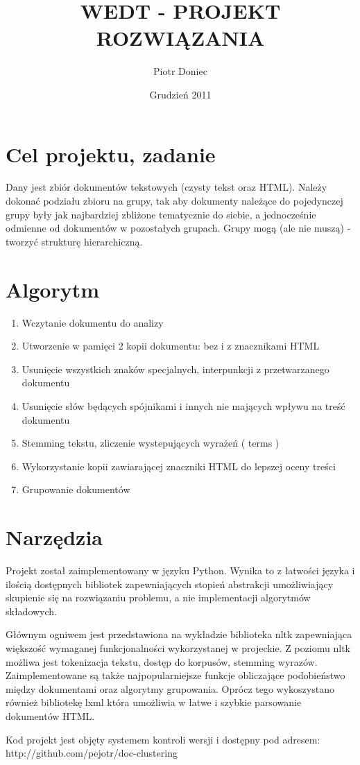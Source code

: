 \documentclass{article}
\begin{document}
\title{WEDT - PROJEKT ROZWIĄZANIA}
\author{Piotr Doniec}
\date {Grudzień 2011}
\maketitle

\section{Cel projektu, zadanie}
Dany jest zbiór dokumentów tekstowych (czysty tekst oraz HTML). Należy dokonać podziału zbioru na grupy, tak aby dokumenty należące do pojedynczej grupy były jak najbardziej zbliżone tematycznie do siebie, a jednocześnie odmienne od dokumentów w pozostałych grupach. Grupy mogą (ale nie muszą) - tworzyć strukturę hierarchiczną. 

\section{}



\section{Algorytm}
\begin{enumerate}
\item Wczytanie dokumentu do analizy
\item Utworzenie w pamięci 2 kopii dokumentu: bez i z znacznikami HTML
\item Usunięcie wszystkich znaków specjalnych, interpunkcji z przetwarzanego dokumentu
\item Usunięcie słów będących spójnikami i innych nie mających wpływu na treść dokumentu
\item Stemming tekstu, zliczenie wystepujących wyrażeń ( terms )
\item Wykorzystanie kopii zawiarającej znaczniki HTML do lepszej oceny treści
\item Grupowanie dokumentów
\end{enumerate}

\section{Narzędzia}
Projekt został zaimplementowany w języku Python. Wynika to z łatwości języka i ilością dostępnych bibliotek zapewniających stopień abstrakcji umożliwiający skupienie się na rozwiązaniu problemu, a nie implementacji algorytmów składowych.

Głównym ogniwem jest przedstawiona na wykładzie biblioteka nltk zapewniająca większość wymaganej funkcjonalności wykorzystanej w projeckie. Z poziomu nltk możliwa jest tokenizacja tekstu, dostęp do korpusów, stemming wyrazów. Zaimplementowane są także najpopularniejsze funkcje obliczające podobieństwo między dokumentami oraz algorytmy grupowania. Oprócz tego wykoszystano również bibliotekę lxml która umożliwia w łatwe i szybkie parsowanie dokumentów HTML.

Kod projekt jest objęty systemem kontroli wersji i dostępny pod adresem: http://github.com/pejotr/doc-clustering
\end{document}
